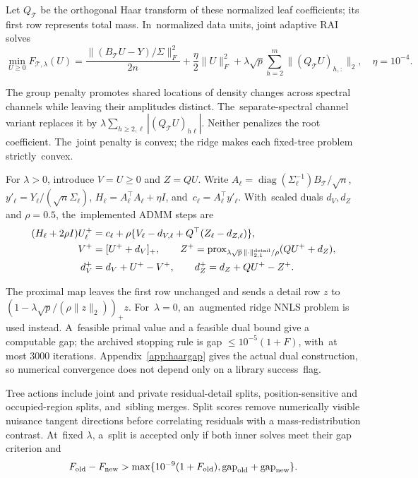 \documentclass[mathematics,article,accept,moreauthors]{Definitions/mdpi}
\newcommand{\diag}{\operatorname{diag}}
\begin{document}
Let $Q_{\mathcal T}$ be the orthogonal Haar transform of these normalized leaf coefficients; its first row represents total mass. In~normalized data units, joint adaptive RAI solves
\begin{equation}\label{eq:raihaar}
 \min_{U\geq0} F_{\mathcal T,\lambda}(U)
 =\frac{\|(B_{\mathcal T}U-Y)/\Sigma\|_F^2}{2n}
 +\frac{\eta}{2}\|U\|_F^2
 +\lambda\sqrt p\sum_{h=2}^{m}\|(Q_{\mathcal T}U)_{h,:}\|_2,
 \quad \eta=10^{-4}.
\end{equation}

The group penalty promotes shared locations of density changes across spectral channels while leaving their amplitudes distinct. The~separate-spectral channel variant replaces it by $\lambda\sum_{h\geq2,\ell}|(Q_{\mathcal T}U)_{h\ell}|$. Neither penalizes the root coefficient. The~joint penalty is convex; the ridge makes each fixed-tree problem strictly~convex.

For $\lambda>0$, introduce $V=U\geq0$ and $Z=QU$. Write $A_\ell=\diag(\Sigma_\ell^{-1})B_{\mathcal T}/\sqrt n$, $y'_\ell=Y_\ell/(\sqrt n\Sigma_\ell)$, $H_\ell=A_\ell^\top A_\ell+\eta I$, and~$c_\ell=A_\ell^\top y'_\ell$. With~scaled duals $d_V,d_Z$ and $\rho=0.5$, the~implemented ADMM steps are
\begin{align}
 (H_\ell+2\rho I)U_\ell^+&=c_\ell+\rho\{V_\ell-d_{V,\ell}+Q^\top(Z_\ell-d_{Z,\ell})\},\label{eq:raiadmm}\\
 V^+&=[U^++d_V]_+,\qquad Z^+=\operatorname{prox}_{\lambda\sqrt p\,\|\cdot\|_{2,1}^{\rm detail}/\rho}(QU^++d_Z),\nonumber\\
 d_V^+&=d_V+U^+-V^+,\qquad d_Z^+=d_Z+QU^+-Z^+.\nonumber
\end{align}

The proximal map leaves the first row unchanged and sends a detail row $z$ to $(1-\lambda\sqrt p/(\rho\|z\|_2))_+z$. For~$\lambda=0$, an~augmented ridge NNLS problem is used instead. A~feasible primal value and a feasible dual bound give a computable gap; the archived stopping rule is gap $\leq10^{-5}(1+F)$, with~at most 3000 iterations. Appendix~\ref{app:haargap} gives the actual dual construction, so numerical convergence does not depend only on a library success~flag.

Tree actions include joint and private residual-detail splits, position-sensitive and occupied-region splits, and~sibling merges. Split scores remove numerically visible nuisance tangent directions before correlating residuals with a mass-redistribution contrast. At~fixed $\lambda$, a~split is accepted only if both inner solves meet their gap criterion and
\begin{equation}\label{eq:raiaction}
 F_{\rm old}-F_{\rm new}>\max\{10^{-9}(1+F_{\rm old}),\mathrm{gap}_{\rm old}+\mathrm{gap}_{\rm new}\}.
\end{equation}
\end{document}
